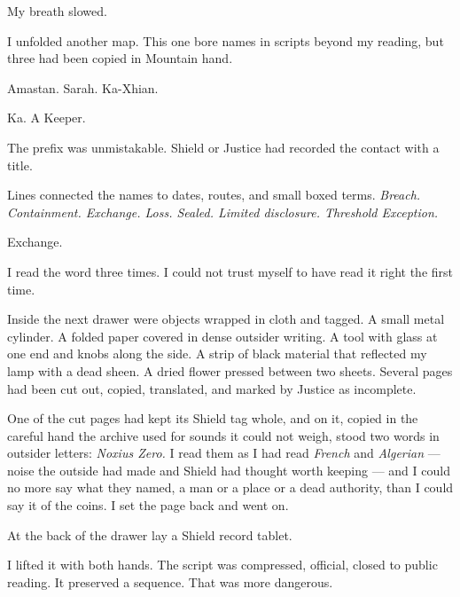 My breath slowed.\par

I unfolded another map. This one bore names in scripts beyond my reading, but three had been copied in Mountain hand.\par

Amastan. Sarah. Ka-Xhian.\par

Ka. A Keeper.\par

The prefix was unmistakable. Shield or Justice had recorded the contact with a title.\par

Lines connected the names to dates, routes, and small boxed terms. \textit{Breach. Containment. Exchange. Loss. Sealed. Limited disclosure. Threshold Exception.}\par

Exchange.\par

I read the word three times. I could not trust myself to have read it right the first time.\par

Inside the next drawer were objects wrapped in cloth and tagged. A small metal cylinder. A folded paper covered in dense outsider writing. A tool with glass at one end and knobs along the side. A strip of black material that reflected my lamp with a dead sheen. A dried flower pressed between two sheets. Several pages had been cut out, copied, translated, and marked by Justice as incomplete.\par

One of the cut pages had kept its Shield tag whole, and on it, copied in the careful hand the archive used for sounds it could not weigh, stood two words in outsider letters: \textit{Noxius Zero.} I read them as I had read \textit{French} and \textit{Algerian} --- noise the outside had made and Shield had thought worth keeping --- and I could no more say what they named, a man or a place or a dead authority, than I could say it of the coins. I set the page back and went on.\par

At the back of the drawer lay a Shield record tablet.\par

I lifted it with both hands. The script was compressed, official, closed to public reading. It preserved a sequence. That was more dangerous.\par

